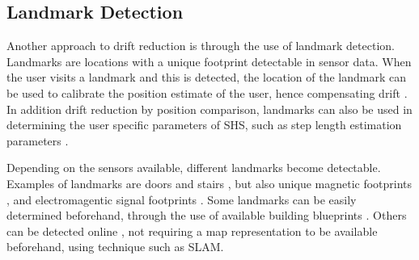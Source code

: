 \subsection*{Landmark Detection}
Another approach to drift reduction is through the use of landmark detection. Landmarks are locations with a unique footprint detectable in sensor data. When the user visits a landmark and this is detected, the location of the landmark can be used to calibrate the position estimate of the user, hence compensating drift \cite{Diaz2017}. In addition drift reduction by position comparison, landmarks can also be used in determining the user specific parameters of \ac{SHS}, such as step length estimation parameters \cite{Gu2019,Shang2015}. \par
Depending on the sensors available, different landmarks become detectable. Examples of landmarks are doors and stairs \cite{Diaz2017,Gu2019,Torok2014}, but also unique magnetic footprints \cite{MunozDiaz2019}, and electromagentic signal footprints \cite{Gu2019}. Some landmarks can be easily determined beforehand, through the use of available building blueprints \cite{Gu2019}. Others can be detected online \cite{Hardegger2012, Hardegger2016}, not requiring a map representation to be available beforehand, using technique such as \ac{SLAM}. 


